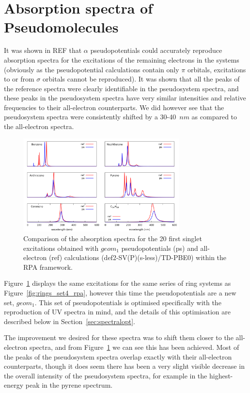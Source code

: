 \documentclass[aip,reprint,nofootinbib]{revtex4-1}
\begin{document}
\section{Absorption spectra of Pseudomolecules}
\label{sec:spectraloptimisation}

It was shown in REF that $\alpha$ pseudopotentials could accurately reproduce absorption spectra for the excitations of the remaining electrons in the systems (obviously as the pseudopotential calculations contain only $\pi$ orbitals, excitations to or from $\sigma$ orbitals cannot be reproduced). It was shown that all the peaks of the reference spectra were clearly identifiable in the pseudosystem spectra, and these peaks in the pseudosystem spectra have very similar intensities and relative frequencies to their all-electron counterparts. We did however see that the pseudosystem spectra were consistently shifted by a 30-40~$nm$ as compared to the all-electron spectra.

\begin{figure}
\begin{center}
\includegraphics[width=8.5cm]{rings_geom1_rpas}
\end{center}
\caption[PAH and pseudo-PAH UV spectra: $geom_1$]{Comparison of the absorption spectra for the 20 first singlet excitations obtained with
$geom_1$ pseudopotentials (ps) and all-electron (ref) calculations (def2-SV(P)(s-less)/TD-PBE0) within the RPA
framework.}\label{fig:rings_geom1_rpas}
\end{figure}

Figure~\ref{fig:rings_geom1_rpas} displays the same excitations for the same series of ring systems as Figure~\ref{fig:rings_set4_rpa}, however this time the pseudopotentials are a new set, $geom_1$. This set of pseudopotentials is optimised specifically with the reproduction of UV spectra in mind, and the details of this optimisation are described below in Section~\ref{sec:spectralopt}.

The improvement we desired for these spectra was to shift them closer to the all-electron spectra, and from Figure~\ref{fig:rings_geom1_rpas} we can see this has been achieved. Most of the peaks of the pseudosystem spectra overlap exactly with their all-electron counterparts, though it does seem there has been a very slight visible decrease in the overall intensity of the pseudosystem spectra, for example in the highest-energy peak in the pyrene spectrum.
\end{document}
